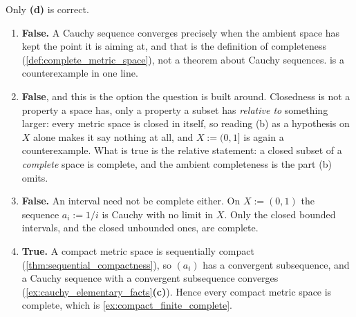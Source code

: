 \begin{exercisesolution}
\label{sol:kobel_cauchy_single_choice}
Only \textbf{(d)} is correct.
\begin{enumerate}[label=\textbf{(\alph*)}]
  \item \textbf{False.} A Cauchy sequence converges precisely when the ambient space has kept the
    point it is aiming at, and that is the definition of completeness
    (\cref{def:complete_metric_space}), not a theorem about Cauchy sequences.
     is a counterexample in one line.
  \item \textbf{False}, and this is the option the question is built around. Closedness is not a
    property a space has, only a property a subset has \emph{relative to} something larger: every
    metric space is closed in itself, so reading (b) as a hypothesis on $X$ alone makes it say
    nothing at all, and $X := (0,1]$ is again a counterexample. What is true is the relative
    statement: a closed subset of a \emph{complete} space is complete, and the ambient
    completeness is the part (b) omits.
  \item \textbf{False.} An interval need not be complete either. On $X := (0,1)$ the sequence
    $a_i := 1/i$ is Cauchy with no limit in $X$. Only the closed bounded intervals, and the closed
    unbounded ones, are complete.
  \item \textbf{True.} A compact metric space is sequentially compact
    (\cref{thm:sequential_compactness}), so $(a_i)$ has a convergent subsequence, and a Cauchy
    sequence with a convergent subsequence converges
    (\cref{ex:cauchy_elementary_facts}\textbf{(c)}). Hence every compact metric space is complete,
    which is \cref{ex:compact_finite_complete}.
\end{enumerate}
\end{exercisesolution}


